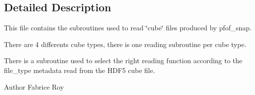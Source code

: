 \subsection{Detailed Description}
This file contains the subroutines used to read \char`\"{}cube\char`\"{} files produced by pfof\+\_\+snap. 

There are 4 differents cube types, there is one reading subroutine per cube type.

There is a subroutine used to select the right reading function according to the file\+\_\+type metadata read from the H\+D\+F5 cube file.

\begin{DoxyAuthor}{Author}
Fabrice Roy 
\end{DoxyAuthor}
